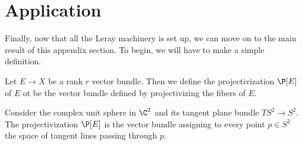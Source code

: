 \section{Application}
Finally, now that all the Leray machinery is set up, we can move on to the main result of this appendix section. To begin, we will have to make a simple definition.
\begin{definition}
Let $E\to X$ be a rank $r$ vector bundle. Then we define the projectivization $\P[E]$ of $E$ ot be the vector bundle defined by projectivizing the fibers of $E$. 
\end{definition}

\begin{example}
      Consider the complex unit sphere in $\C^2$ and its tangent plane bundle $TS^2\to S^2$. The projectivization $\P[E]$ is the vector bundle assigning to every point $p \in S^2$ the space of tangent lines passing through $p$.
\end{example}

